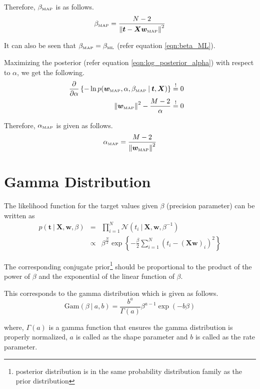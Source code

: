 \documentclass[11pt]{article}
\newcommand{\mle}[1]{{#1}_{\text{\tiny ML}}}
\newcommand{\map}[1]{{#1}_{\text{\tiny MAP}}}
\newcommand\given[1][]{\:#1\vert\:}
\newcommand{\norm}[1]{\left\lVert#1\right\rVert}
\begin{document}
Therefore, $\map{\beta}$ is as follows.
\begin{equation}
    \map{\beta} = \frac{N-2}{\norm{\bm{t} - \bm{X}\map{\bm{w}}}^2}
\end{equation}

It can also be seen that $\map{\beta} = \mle{\beta}$ (refer equation \ref{eqn:beta_ML}).

Maximizing the posterior (refer equation \ref{eqn:log_posterior_alpha}) with respect to $\alpha$, we get the following.
\begin{eqnarray}
    \frac{\partial }{\partial  \alpha} \left\{ -\ln{p(\map{\bm{w}}, \alpha, \map{\beta} \given \bm{t}, \bm{X})} \right\}
    &\overset{!}{=} 0&  \\
    \norm{\map{\bm{w}}}^2 - \frac{M-2}{\alpha}
    &\overset{!}{=} 0& 
\end{eqnarray}

Therefore, $\map{\alpha}$ is given as follows.
\begin{equation}\label{alpha_map}
    \map{\alpha} = \frac{M-2}{\norm{\map{\bm{w}}}^2}
\end{equation}

\section{Gamma Distribution}

The likelihood function for the target values given $\beta$ (precision parameter) can be written as 
\begin{eqnarray}
    p(\bm{t} \given \bm{X}, \bm{w}, \beta) &=& \prod_{i=1}^N \mathcal{N}(t_i \given \bm{X}, \bm{w}, \beta^{-1}) \\
    &\propto& \beta^{\frac{N}{2}}\exp\left\{-\frac{\beta}{2} \sum_{i=1}^N(t_i - (\bm{X}\bm{w})_i)^2 \right\}
\end{eqnarray}

The corresponding conjugate prior\footnote{posterior distribution is in the same probability distribution family as the prior distribution} should be proportional to the product of the power of $\beta$ and the exponential of the linear function of $\beta$. 

This corresponds to the gamma distribution which is given as follows.
\begin{equation} \label{gamma_dist}
    \text{Gam}\left(\beta \given a, b\right) = \frac{b^a}{\Gamma(a)}\beta^{a-1}\exp{(-b\beta)}
\end{equation}

where, $\Gamma(a)$ is a gamma function that ensures the gamma distribution is properly normalized, $a$ is called as the shape parameter and $b$ is called as the rate parameter.  
\end{document}
